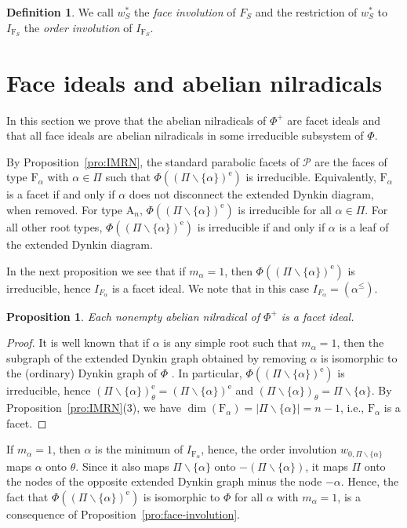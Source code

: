 \documentclass[10pt]{amsart}
\newtheorem{pro}[thm]{Proposition}
\theoremstyle{definition}
\newtheorem{defi}[thm]{Definition}
\theoremstyle{remark}
\newcommand\smeno{\smallsetminus}
\newcommand\pol{\mathcal P}
\newcommand\al{\alpha}
\newcommand\erm{{\mathrm{e}}}
\renewcommand{\leq}{\leqslant}
\begin{document}
\begin{defi}
We call $w^*_S$ the {\it face involution} of $F_S$ and the restriction of $w^*_S$
to $I_{\mathrm F_S}$ the {\it order involution} of  $I_{\mathrm F_S}$. 
\end{defi}

\section{Face ideals and abelian nilradicals}\label{sec:face-ideals}

In this section we prove that the abelian nilradicals of $\Phi^+$ are facet ideals and that all face ideals are abelian nilradicals in some irreducible subsystem of $\Phi$.  
\par

By Proposition~\ref{pro:IMRN}, the standard parabolic facets of $\pol$ are the faces of type $\mathrm F_{\al}$ with $\al\in \Pi$ such that  $\Phi((\Pi\smeno\{\al\})^\erm)$ is irreducible.
Equivalently, $\mathrm F_\al$ is a facet if and only if $\al$ does not disconnect the extended Dynkin diagram, when removed.
For type $\mathrm A_n$, $\Phi((\Pi\smeno \{\al\})^\erm)$ is irreducible for all $\al\in \Pi$.
For all other root types, $\Phi((\Pi\smeno \{\al\})^\erm)$ is irreducible if and only if  $\al$ is a leaf of the extended Dynkin diagram.
\par

In the next proposition we see that if $m_\al=1$, then  $\Phi((\Pi\smeno\{\al\})^\erm)$ is irreducible, hence $I_{F_\al}$ is a facet ideal. 
We note that in this case  $I_{F_\al}=(\al^\leq)$.

\begin{pro}\label{pro:abnil-are-facets}
Each nonempty abelian nilradical of $\Phi^+$ is a facet ideal.
\end{pro}

\begin{proof}
It is well known that if $\al$ is any simple root such that $m_\al=1$,  then the subgraph of the extended Dynkin graph obtained by removing $\al$ is isomorphic to the (ordinary) Dynkin graph of $\Phi$ \cite{IM}. 
In particular, $\Phi((\Pi\smeno \{\al\})^\erm)$ is irreducible, hence $(\Pi\smeno \{\al\})^\erm_\theta=(\Pi\smeno \{\al\})^\erm$ and $(\Pi\smeno \{\al\})_\theta=\Pi\smeno \{\al\}$. 
By Proposition~\ref{pro:IMRN}(3), we have $\dim(\mathrm F_\al)=|\Pi\smeno \{\al\}|=n-1$, i.e., $\mathrm F_\al$ is a facet. 
\end{proof}

If $m_\al=1$, then $\al$ is the minimum of $I_{\mathrm F_\al}$, hence, the order involution $w_{0,\Pi\smeno\{\al\}}$ maps $\al$ onto $\theta$. 
Since it also maps $\Pi\smeno\{\al\}$ onto  $-(\Pi\smeno\{\al\})$, it maps $\Pi$ onto the nodes of the opposite extended Dynkin graph minus the node $-\al$. 
Hence, the fact that $\Phi((\Pi\smeno \{\al\})^\erm)$ is isomorphic to $\Phi$ for all $\al$ with $m_\al=1$, is a consequence of Proposition~\ref{pro:face-involution}.
\end{document}
